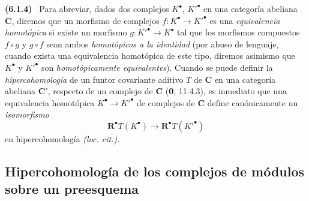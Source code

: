 \documentclass[10pt,oneside]{book}
\newenvironment{env}[1][]{\par\medskip\noindent\textbf{(#1)}\ }{\par}
\begin{document}
\begin{env}[6.1.4]
\label{III.6.1.4}
Para abreviar, dados dos complejos $K^\bullet$, $K'^\bullet$ en una categoría
abeliana $\boldsymbol C$, diremos que un morfismo de complejos
$f:K^\bullet\to K'^\bullet$ es una \emph{equivalencia homotópica} si existe un
morfismo $g:K'^\bullet\to K^\bullet$ tal que los morfismos compuestos
$f\circ g$ y $g\circ f$ sean ambos \emph{homotópicos a la identidad} (por abuso de
lenguaje, cuando exista una equivalencia homotópica de este tipo, diremos
asimismo que $K^\bullet$ y $K'^\bullet$ son \emph{homotópicamente equivalentes}).
Cuando se puede definir la \emph{hipercohomología} de un funtor covariante aditivo
$T$ de $\boldsymbol C$ en una categoría abeliana $\boldsymbol C'$, respecto de un complejo de $\boldsymbol C$
(\textbf 0, 11.4.3), es inmediato que una equivalencia homotópica
$K^\bullet\to K'^\bullet$ de complejos de $\boldsymbol C$ define canónicamente un
\emph{isomorfismo}
\[
  \mathbf R^\bullet T(K^\bullet)\to
  \mathbf R^\bullet T(K'^\bullet)
\]
en hipercohomología \emph{(loc. cit.)}.
\end{env}

\subsection{Hipercohomología de los complejos de módulos sobre un preesquema}
\label{subsection:III.6.2}
\end{document}
